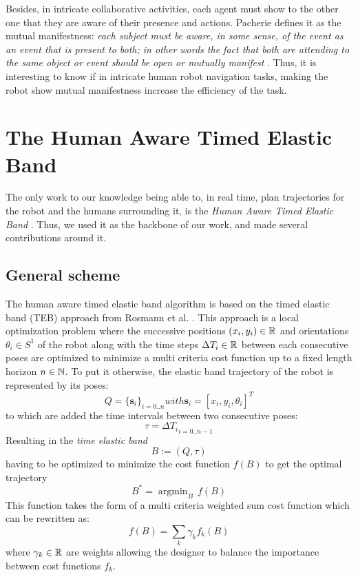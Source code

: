 \documentclass[a4paper,11pt,twoside]{StyleThese}
\begin{document}
Besides, in intricate collaborative activities, each agent must show to the other one that they are aware of their presence and actions. Pacherie defines it as the mutual manifestness: \textit{each subject must be aware, in some sense, of the event as an event that is present to both; in other words the fact that both are attending to the same object or event should be open or mutually manifest} \cite{pacherie_phenomenology_2011}. Thus, it is interesting to know if in intricate human robot navigation tasks, making the robot show mutual manifestness increase the efficiency of the task.



\section{The Human Aware Timed Elastic Band}
The only work to our knowledge being able to, in real time, plan trajectories for the robot and the humans surrounding it, is the \textit{Human Aware Timed Elastic Band} \cite{khambhaita_viewing_2017}. Thus, we used it as the backbone of our work, and made several contributions around it.

\subsection{General scheme}
The human aware timed elastic band algorithm is based on the timed elastic band (TEB) approach from Rosmann et al. \cite{rosmann_efficient_2013}. This approach is a local optimization problem where the successive positions $(x_i, y_i) \in \mathbb{R}$ and orientations $\theta_i \in S^1$ of the robot along with the time steps $\Delta T_i \in \mathbb{R}$ between each consecutive poses are optimized to minimize a multi criteria cost function up to a fixed length horizon $n \in \mathbb{N}$. To put it otherwise, the elastic band trajectory of the robot is represented by its poses: 
\[Q = \{\textbf{s}_i\}_{i=0..n} with \textbf{s}_i = [x_i, y_i, \theta_i]^T\] to which are added the time intervals between two consecutive poses: \[\tau = {\Delta T_i}_{i=0..n-1}\] Resulting in the \textit{time elastic band} \[B := (Q, \tau)\] having to be optimized to minimize the cost function $f(B)$ to get the optimal trajectory \[B^* = \mathop{\mathrm{argmin}}_B\,f(B)\]
This function takes the form of a multi criteria weighted sum cost function which can be rewritten as: \[ f(B) = \sum_{k} \gamma_k f_k(B) \] where $\gamma_k \in \mathbb{R}$ are weights allowing the designer to balance the importance between cost functions $f_k$.
\end{document}
